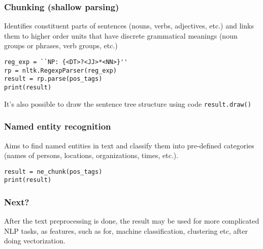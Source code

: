\begin{frame}[fragile]
\frametitle{Chunking (shallow parsing)}
 Identifies constituent parts of sentences (nouns, verbs, adjectives, etc.) and links them to higher order units that have discrete grammatical meanings (noun groups or phrases, verb groups, etc.)
\begin{lstlisting}
reg_exp = ``NP: {<DT>?<JJ>*<NN>}''
rp = nltk.RegexpParser(reg_exp)
result = rp.parse(pos_tags)
print(result)
\end{lstlisting}
It’s also possible to draw the sentence tree structure using code \lstinline|result.draw()|
\end{frame}

\begin{frame}[fragile]
\frametitle{Named entity recognition}
Aims to find named entities in text and classify them into pre-defined categories (names of persons, locations, organizations, times, etc.).
\begin{lstlisting}
result = ne_chunk(pos_tags)
print(result)
\end{lstlisting}
\end{frame}

\begin{frame}[fragile]
\frametitle{Next?}
 After the text preprocessing is done, the result may be used for more complicated NLP tasks, as features, such as for, machine classification, clustering etc, after doing vectorization.
\end{frame}